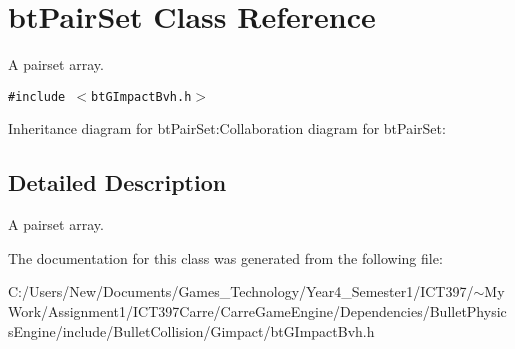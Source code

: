 \hypertarget{classbt_pair_set}{
\section{btPairSet Class Reference}
\label{classbt_pair_set}
}
A pairset array.  


{\tt \#include $<$btGImpactBvh.h$>$}

Inheritance diagram for btPairSet:Collaboration diagram for btPairSet:

\subsection{Detailed Description}
A pairset array. 

The documentation for this class was generated from the following file:\begin{CompactItemize}
\item 
C:/Users/New/Documents/Games\_\-Technology/Year4\_\-Semester1/ICT397/$\sim$My Work/Assignment1/ICT397Carre/CarreGameEngine/Dependencies/BulletPhysicsEngine/include/BulletCollision/Gimpact/btGImpactBvh.h\end{CompactItemize}
